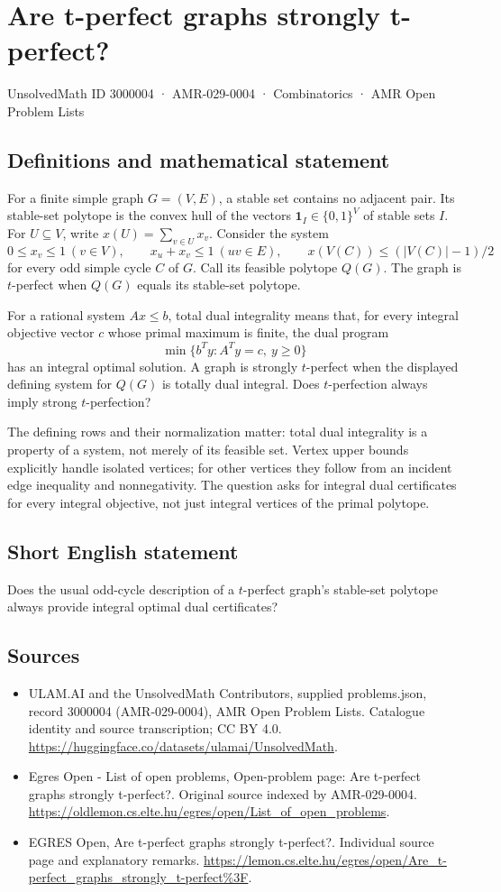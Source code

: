 \documentclass[11pt,a4paper]{article}
\begin{document}
\section*{Are t-perfect graphs strongly t-perfect?}\label{3000004}
{\small UnsolvedMath ID 3000004 · AMR-029-0004 · Combinatorics · AMR Open Problem Lists}
\subsection{Definitions and mathematical statement}
For a finite simple graph $G=(V,E)$, a stable set contains no adjacent
pair. Its stable-set polytope is the convex hull of the vectors
$\mathbf1_I\in\{0,1\}^V$ of stable sets $I$. For $U\subseteq V$, write
$x(U)=\sum_{v\in U}x_v$. Consider the system
\[
 0\le x_v\le1\ (v\in V),\qquad x_u+x_v\le1\ (uv\in E),
 \qquad x(V(C))\le (|V(C)|-1)/2
\]
for every odd simple cycle $C$ of $G$. Call its feasible polytope $Q(G)$.
The graph is $t$-perfect when $Q(G)$ equals its stable-set polytope.

For a rational system $Ax\le b$, total dual integrality means that, for
every integral objective vector $c$ whose primal maximum is finite, the
dual program
\[
             \min\{b^Ty:A^Ty=c,\ y\ge0\}
\]
has an integral optimal solution. A graph is strongly $t$-perfect when
the displayed defining system for $Q(G)$ is totally dual integral.
Does $t$-perfection always imply strong $t$-perfection?

The defining rows and their normalization matter: total dual integrality
is a property of a system, not merely of its feasible set. Vertex upper
bounds explicitly handle isolated vertices; for other vertices they follow
from an incident edge inequality and nonnegativity. The question asks for
integral dual certificates for every integral objective, not just integral
vertices of the primal polytope.
\subsection{Short English statement}
Does the usual odd-cycle description of a $t$-perfect graph's
stable-set polytope always provide integral optimal dual certificates?
\subsection{Sources}
\begin{itemize}
\item[S1] ULAM.AI and the UnsolvedMath Contributors, supplied problems.json, record 3000004 (AMR-029-0004), AMR Open Problem Lists. Catalogue identity and source transcription; CC BY 4.0.
\url{https://huggingface.co/datasets/ulamai/UnsolvedMath}.
\item[S2] Egres Open - List of open problems, Open-problem page: Are t-perfect graphs strongly t-perfect?. Original source indexed by AMR-029-0004.
\url{https://oldlemon.cs.elte.hu/egres/open/List_of_open_problems}.
\item[S3] EGRES Open, Are t-perfect graphs strongly t-perfect?. Individual source page and explanatory remarks.
\url{https://lemon.cs.elte.hu/egres/open/Are_t-perfect_graphs_strongly_t-perfect%3F}.
\end{itemize}
\end{document}
